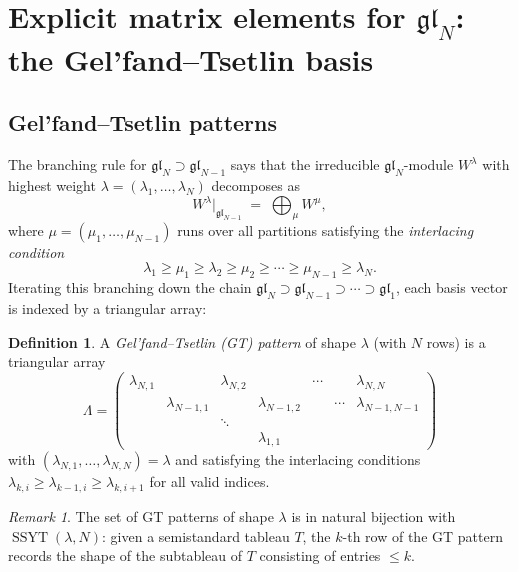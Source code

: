 \documentclass[12pt,a4paper]{article}
\theoremstyle{definition}
\newtheorem{definition}[theorem]{Definition}
\theoremstyle{remark}
\newtheorem{remark}[theorem]{Remark}
\newcommand{\gl}{\mathfrak{gl}}
\newcommand{\SSYT}{\operatorname{SSYT}}
\begin{document}
\section{Explicit matrix elements for $\gl_N$: the Gel'fand--Tsetlin basis}
\label{sec:GT}

\subsection{Gel'fand--Tsetlin patterns}

The branching rule for $\gl_N \supset \gl_{N-1}$ says that the
irreducible $\gl_N$-module $W^\lambda$ with highest weight
$\lambda = (\lambda_1, \ldots, \lambda_N)$ decomposes as
\[
  W^\lambda\big|_{\gl_{N-1}}
  \;=\; \bigoplus_\mu W^\mu,
\]
where $\mu = (\mu_1, \ldots, \mu_{N-1})$ runs over all partitions
satisfying the \emph{interlacing condition}
\[
  \lambda_1 \geqslant \mu_1 \geqslant \lambda_2 \geqslant \mu_2
  \geqslant \cdots \geqslant \mu_{N-1} \geqslant \lambda_N.
\]
Iterating this branching down the chain
$\gl_N \supset \gl_{N-1} \supset \cdots \supset \gl_1$, each basis
vector is indexed by a triangular array:

\begin{definition}
A \emph{Gel'fand--Tsetlin (GT) pattern} of shape $\lambda$ (with
$N$ rows) is a triangular array
\[
  \Lambda = \begin{pmatrix}
    \lambda_{N,1} & & \lambda_{N,2} & & \cdots & & \lambda_{N,N} \\
    & \lambda_{N-1,1} & & \lambda_{N-1,2} & & \cdots & \lambda_{N-1,N-1} \\
    & & \ddots & & & & \\
    & & & \lambda_{1,1} & & &
  \end{pmatrix}
\]
with $(\lambda_{N,1}, \ldots, \lambda_{N,N}) = \lambda$ and satisfying
the interlacing conditions
$\lambda_{k,i} \geqslant \lambda_{k-1,i} \geqslant \lambda_{k,i+1}$
for all valid indices.
\end{definition}

\begin{remark}
The set of GT patterns of shape $\lambda$ is in natural bijection
with $\SSYT(\lambda, N)$: given a semistandard tableau $T$, the $k$-th
row of the GT pattern records the shape of the subtableau of $T$
consisting of entries $\leqslant k$.
\end{remark}
\end{document}
